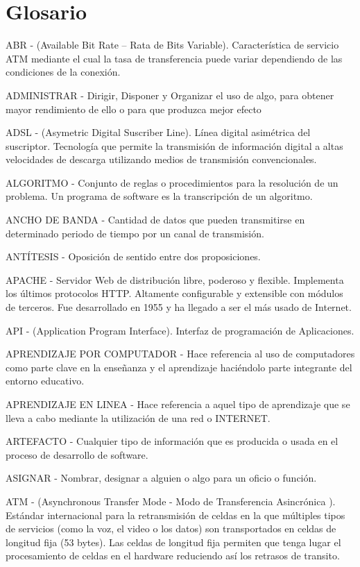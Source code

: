 \chapter*{Glosario}
\label{glosario}
ABR - (Available Bit Rate – Rata de Bits Variable). Característica de servicio ATM mediante el cual la tasa de transferencia puede variar dependiendo de las condiciones de la conexión.

ADMINISTRAR - Dirigir, Disponer y Organizar el uso de algo, para obtener mayor rendimiento de ello o para que produzca mejor efecto

ADSL - (Asymetric Digital Suscriber Line). Línea digital asimétrica del suscriptor. Tecnología que permite la transmisión de información digital a altas velocidades de descarga utilizando medios de transmisión convencionales.

ALGORITMO - Conjunto de reglas o procedimientos para la resolución de un problema. Un programa de software es la transcripción de un algoritmo.

ANCHO DE BANDA - Cantidad de datos que pueden transmitirse en determinado periodo de tiempo por un canal de transmisión.

ANTÍTESIS - Oposición de sentido entre dos proposiciones.

APACHE - Servidor Web de distribución libre,  poderoso y flexible. Implementa los últimos protocolos HTTP. Altamente configurable y extensible con módulos de terceros. Fue desarrollado en 1955 y ha llegado a ser el más usado de Internet.

API - (Application Program Interface). Interfaz de programación de Aplicaciones.

APRENDIZAJE POR COMPUTADOR - Hace referencia al uso de computadores como parte clave en la enseñanza y el aprendizaje haciéndolo parte integrante del entorno educativo.

APRENDIZAJE EN LINEA - Hace referencia a aquel tipo de aprendizaje que se lleva a cabo mediante la utilización de una red o INTERNET.

ARTEFACTO - Cualquier tipo de información que es producida o usada en el proceso de desarrollo de software.

ASIGNAR - Nombrar, designar a alguien o algo para un oficio o función.

ATM - (Asynchronous Transfer Mode - Modo de Transferencia Asincrónica ). Estándar internacional para la retransmisión de celdas en la que múltiples tipos de servicios (como la voz, el video o los datos) son transportados en celdas de longitud fija (53 bytes). Las celdas de longitud fija permiten que tenga lugar el procesamiento de celdas en el hardware reduciendo así los retrasos de transito.

